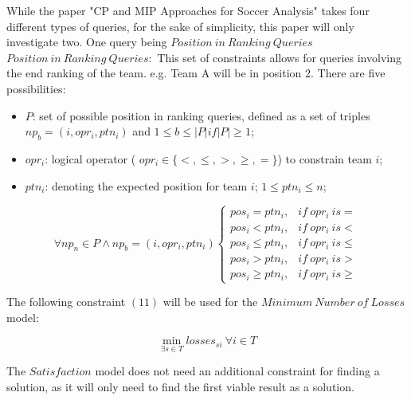 \documentclass{article}
\begin{document}
	While the paper "CP and MIP Approaches for Soccer Analysis" takes four different types of queries, for the sake of simplicity, this paper will only investigate two. One query being \(Position\ in\ Ranking\ Queries\)
	\(Position\ in\ Ranking\ Queries:\) This set of constraints allows for queries involving the end ranking of the team. e.g. Team A will be in position 2. There are five possibilities:
	\begin{itemize}
		\item \(P\): set of possible position in ranking queries, defined as a set of triples \(np_b = (i, opr_i,ptn_i)\) and \(1 \leq b \leq |P| if |P| \geq 1 \);
		\item \(opr_i\): logical operator ( \(opr_i \in \{ <, \leq, >, \geq, = \} \)) to constrain team \(i\);
		\item \(ptn_i\): denoting the expected position for team \(i\); \(1 \leq ptn_i \leq n\);
	\end{itemize}

	\begin{equation}
		\forall np_n \in P \wedge np_b = (i, opr_i, ptn_i)
		\begin{cases}
			pos_i = ptn_i, & if\ opr_i\ is =\\
			pos_i < ptn_i, & if\ opr_i\ is <\\
			pos_i \leq ptn_i, & if\ opr_i\ is \leq\\
			pos_i > ptn_i, & if\ opr_i\ is >\\
			pos_i \geq ptn_i, & if\ opr_i\ is \geq
		\end{cases}
	\end{equation}
	
	The following constraint \((11)\) will be used for the \(Minimum\ Number\ of\ Losses\) model:
	
	\begin{equation}
		\min_{\exists s \in T} losses_{si}\ \forall i \in T
	\end{equation}
	
	The \(Satisfaction\) model does not need an additional constraint for finding a solution, as it will only need to find the first viable result as a solution.
\end{document}
